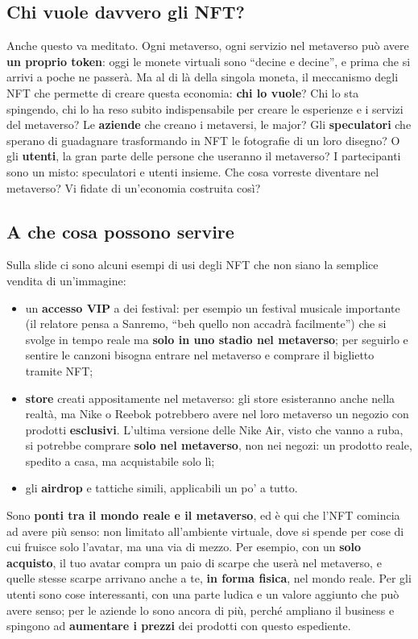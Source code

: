 \subsection{Chi vuole davvero gli NFT?}

Anche questo va meditato. Ogni metaverso, ogni servizio nel metaverso può avere
\textbf{un proprio token}: oggi le monete virtuali sono ``decine e decine'', e
prima che si arrivi a poche ne passerà. Ma al di là della singola moneta, il
meccanismo degli NFT che permette di creare questa economia: \textbf{chi lo
vuole}? Chi lo sta spingendo, chi lo ha reso subito indispensabile per creare le
esperienze e i servizi del metaverso? Le \textbf{aziende} che creano i metaversi,
le major? Gli \textbf{speculatori} che sperano di guadagnare trasformando in NFT
le fotografie di un loro disegno? O gli \textbf{utenti}, la gran parte delle
persone che useranno il metaverso? I partecipanti sono un misto: speculatori e
utenti insieme. Che cosa vorreste diventare nel metaverso? Vi fidate di
un'economia costruita così?

\subsection{A che cosa possono servire}

Sulla slide ci sono alcuni esempi di usi degli NFT che non siano la semplice
vendita di un'immagine:
\begin{itemize}
  \item un \textbf{accesso VIP} a dei festival: per esempio un festival musicale
        importante (il relatore pensa a Sanremo, ``beh quello non accadrà
        facilmente'') che si svolge in tempo reale ma \textbf{solo in uno stadio
        nel metaverso}; per seguirlo e sentire le canzoni bisogna entrare nel
        metaverso e comprare il biglietto tramite NFT;
  \item \textbf{store} creati appositamente nel metaverso: gli store esisteranno
        anche nella realtà, ma Nike o Reebok potrebbero avere nel loro metaverso
        un negozio con prodotti \textbf{esclusivi}. L'ultima versione delle Nike
        Air, visto che vanno a ruba, si potrebbe comprare \textbf{solo nel
        metaverso}, non nei negozi: un prodotto reale, spedito a casa, ma
        acquistabile solo lì;
  \item gli \textbf{airdrop} e tattiche simili, applicabili un po' a tutto.
\end{itemize}
Sono \textbf{ponti tra il mondo reale e il metaverso}, ed è qui che l'NFT
comincia ad avere più senso: non limitato all'ambiente virtuale, dove si spende
per cose di cui fruisce solo l'avatar, ma una via di mezzo. Per esempio, con un
\textbf{solo acquisto}, il tuo avatar compra un paio di scarpe che userà nel
metaverso, e quelle stesse scarpe arrivano anche a te, \textbf{in forma fisica},
nel mondo reale. Per gli utenti sono cose interessanti, con una parte ludica e un
valore aggiunto che può avere senso; per le aziende lo sono ancora di più, perché
ampliano il business e spingono ad \textbf{aumentare i prezzi} dei prodotti con
questo espediente.

